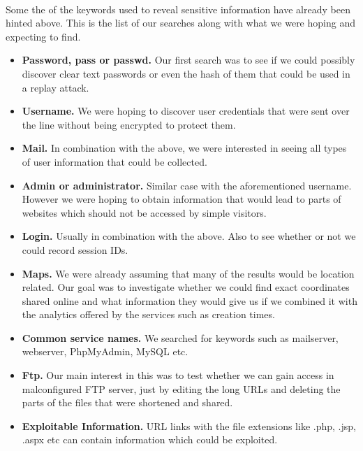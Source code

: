 \documentclass[12pt]{article}
\begin{document}
\paragraph{}
Some the of the keywords used to reveal sensitive information have already been hinted above. This is the list of our searches along with what we were hoping and expecting to find.

\begin{itemize}

\item \textbf{Password, pass or passwd.} Our first search was to see if we could possibly discover clear text passwords or even the hash of them that could be used in a replay attack.

\item \textbf{Username.} We were hoping to discover user credentials that were sent over the line without being encrypted to protect them.

\item \textbf{Mail.} In combination with the above, we were interested in seeing all types of user information that could be collected.

\item \textbf{Admin or administrator.} Similar case with the aforementioned username. However we were hoping to obtain information that would lead to parts of websites which should not be accessed by simple visitors.

\item \textbf{Login.} Usually in combination with the above. Also to see whether or not we could record session IDs.

\item \textbf{Maps.} We were already assuming that many of the results would be location related. Our goal was to investigate whether we could find exact coordinates shared online and what information they would give us if we combined it with the analytics offered by the services such as creation times.

 \item \textbf{Common service names.} We searched for keywords such as mailserver, webserver, PhpMyAdmin, MySQL etc.

\item \textbf{Ftp.} Our main interest in this was to test whether we can gain access in malconfigured FTP server, just by editing the long URLs and deleting the parts of the files that were shortened and shared.

\item \textbf{Exploitable Information.} URL links with the file extensions like .php, .jsp, .aspx etc can contain information which could be exploited.


\end{itemize}
\end{document}
